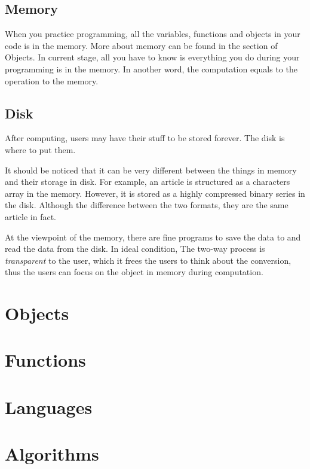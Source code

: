 

\subsection{Memory}

When you practice programming,
all the variables, functions and objects in your code is in the memory.
More about memory can be found in the section of Objects.
In current stage,
all you have to know is everything you do during your programming is in the memory.
In another word,
the computation equals to the operation to the memory.

\subsection{Disk}

After computing,
users may have their stuff to be stored forever.
The disk is where to put them.

It should be noticed that it can be very different between the things in memory and their storage in disk.
For example, an article is structured as a characters array in the memory.
However, it is stored as a highly compressed binary series in the disk.
Although the difference between the two formats,
they are the same article in fact.

At the viewpoint of the memory,
there are fine programs to save the data to and read the data from the disk.
In ideal condition,
The two-way process is \emph{transparent} to the user,
which it frees the users to think about the conversion,
thus the users can focus on the object in memory during computation.

\section{Objects}

\section{Functions}

\section{Languages}

\section{Algorithms}


